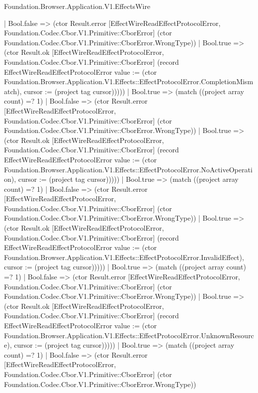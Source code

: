 \begin{lexlean}{Foundation.Browser.Application.V1.EffectsWire}
\begin{semanticmodule}
{                                    | Bool.false => (ctor Result.error [EffectWireReadEffectProtocolError, Foundation.Codec.Cbor.V1.Primitive::CborError] (ctor Foundation.Codec.Cbor.V1.Primitive::CborError.WrongType))
                                    | Bool.true => (ctor Result.ok [EffectWireReadEffectProtocolError, Foundation.Codec.Cbor.V1.Primitive::CborError] (record EffectWireReadEffectProtocolError {value := (ctor Foundation.Browser.Application.V1.Effects::EffectProtocolError.CompletionMismatch), cursor := (project tag cursor)}))))
                                | Bool.true => (match ((project array count) =? 1)
                                  | Bool.false => (ctor Result.error [EffectWireReadEffectProtocolError, Foundation.Codec.Cbor.V1.Primitive::CborError] (ctor Foundation.Codec.Cbor.V1.Primitive::CborError.WrongType))
                                  | Bool.true => (ctor Result.ok [EffectWireReadEffectProtocolError, Foundation.Codec.Cbor.V1.Primitive::CborError] (record EffectWireReadEffectProtocolError {value := (ctor Foundation.Browser.Application.V1.Effects::EffectProtocolError.NoActiveOperation), cursor := (project tag cursor)}))))
                              | Bool.true => (match ((project array count) =? 1)
                                | Bool.false => (ctor Result.error [EffectWireReadEffectProtocolError, Foundation.Codec.Cbor.V1.Primitive::CborError] (ctor Foundation.Codec.Cbor.V1.Primitive::CborError.WrongType))
                                | Bool.true => (ctor Result.ok [EffectWireReadEffectProtocolError, Foundation.Codec.Cbor.V1.Primitive::CborError] (record EffectWireReadEffectProtocolError {value := (ctor Foundation.Browser.Application.V1.Effects::EffectProtocolError.InvalidEffect), cursor := (project tag cursor)}))))
                            | Bool.true => (match ((project array count) =? 1)
                              | Bool.false => (ctor Result.error [EffectWireReadEffectProtocolError, Foundation.Codec.Cbor.V1.Primitive::CborError] (ctor Foundation.Codec.Cbor.V1.Primitive::CborError.WrongType))
                              | Bool.true => (ctor Result.ok [EffectWireReadEffectProtocolError, Foundation.Codec.Cbor.V1.Primitive::CborError] (record EffectWireReadEffectProtocolError {value := (ctor Foundation.Browser.Application.V1.Effects::EffectProtocolError.UnknownResource), cursor := (project tag cursor)}))))
                          | Bool.true => (match ((project array count) =? 1)
                            | Bool.false => (ctor Result.error [EffectWireReadEffectProtocolError, Foundation.Codec.Cbor.V1.Primitive::CborError] (ctor Foundation.Codec.Cbor.V1.Primitive::CborError.WrongType))
}
\end{semanticmodule}
\end{lexlean}
